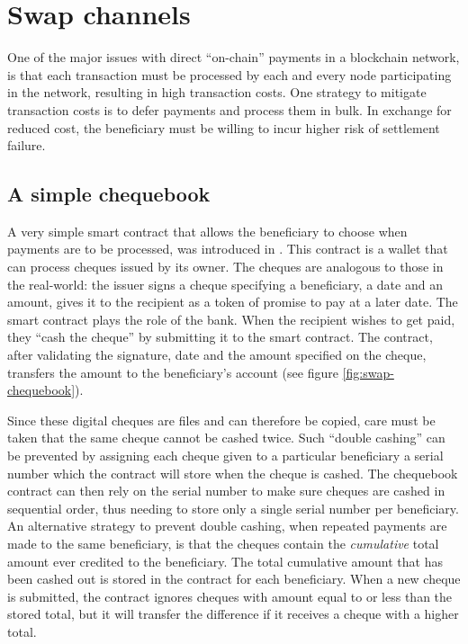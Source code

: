 
\section{Swap channels}

One of the major issues with direct ``on-chain'' payments in a blockchain network, is that each transaction must be processed by each and every node participating in the network, resulting in high transaction costs.
One strategy to mitigate transaction costs is to defer payments and process them in bulk. In exchange for reduced cost, the beneficiary must be willing to incur higher risk of settlement failure.

\subsection{A simple chequebook}\label{subsec:simple-chequebook}

A very simple smart contract that allows the beneficiary to choose when payments are to be processed, was introduced in \cite{ethersphere2016sw3}.
This  contract is a wallet that can process cheques issued by its owner. The cheques are
analogous to those in the real-world: the issuer signs a cheque specifying a beneficiary, a date and an amount,
gives it to the recipient as a token of promise to pay at a later date. The smart contract plays the
role of the bank. When the recipient wishes to get paid, they ``cash the cheque'' by submitting it to the smart contract. The contract, after validating the signature, date and the amount specified on the cheque, transfers the amount to the beneficiary's account (see figure \ref{fig:swap-chequebook}).



Since these digital cheques are files and can therefore be copied, care must be taken that the same cheque cannot be cashed twice. Such ``double cashing'' can be prevented by assigning each cheque given to a particular beneficiary a serial number which the contract will store when the cheque is cashed. The chequebook contract can then rely on the serial number to make sure cheques are cashed in sequential order, thus needing to store only a single serial number per beneficiary.
An alternative strategy to prevent double cashing, when repeated payments are made to the same beneficiary, is that the cheques contain the \emph{cumulative} total amount ever credited to the beneficiary. The total cumulative amount that has been cashed out is stored in the contract for each beneficiary. When a new cheque is submitted, the contract ignores cheques with amount equal to or less than the stored total, but it will transfer the difference if it receives a cheque with a higher total.

